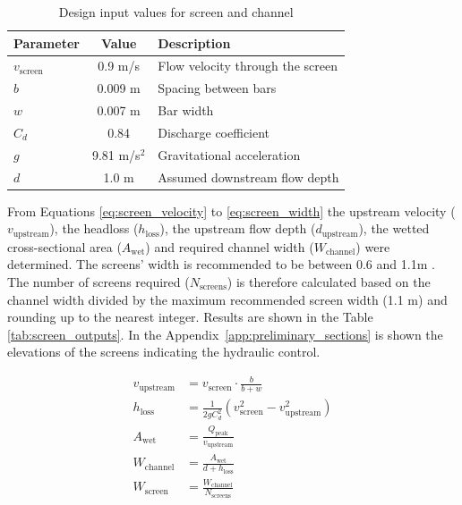 \documentclass[11pt]{article}
\begin{document}
\begin{table}[h]
\centering
\caption{Design input values for screen and channel}
\label{tab:screen_inputs}
\begin{tabular}{|l|c|l|}
\hline
\textbf{Parameter} & \textbf{Value} & \textbf{Description} \\
\hline
$v_{\text{screen}}$ & 0.9 m/s & Flow velocity through the screen \\
$b$ & 0.009 m & Spacing between bars \\
$w$ & 0.007 m & Bar width \\
$C_d$ & 0.84 & Discharge coefficient \\
$g$ & 9.81 m/s$^2$ & Gravitational acceleration \\
$d$ & 1.0 m & Assumed downstream flow depth \\
\hline
\end{tabular}
\end{table}

From Equations \eqref{eq:screen_velocity} to 
\eqref{eq:screen_width}
 the upstream velocity ($v_\text{upstream}$), 
the headloss ($h_\text{loss}$), the upstream flow depth ($d_\text{upstream}$), 
the wetted cross-sectional area ($A_\text{wet}$) and required channel width ($W_\text{channel}$) 
were determined.
The screens' width is recommended to be between 0.6 and 1.1m \cite{metcalf_2014_wastewater}. 
The number of screens required ($N_\text{screens}$) is therefore calculated based on the 
channel width divided by the maximum recommended screen width (1.1 m) and 
rounding up to the nearest integer. Results are shown 
in the Table \ref{tab:screen_outputs}. In the Appendix~\ref{app:preliminary_sections} is shown the 
elevations of the screens indicating the hydraulic control.

\begin{align}
  v_{\text{upstream}} &= v_{\text{screen}} \cdot \frac{b}{b + w} \label{eq:screen_velocity} \\
  h_{\text{loss}} &= \frac{1}{2g C_d^2} \left( v_{\text{screen}}^2 - v_{\text{upstream}}^2 \right) \label{eq:screen_headloss} \\
  A_{\text{wet}} &= \frac{Q_{\text{peak}}}{v_{\text{upstream}}} \label{eq:screen_area} \\
  W_{\text{channel}} &= \frac{A_{\text{wet}}}{d + h_{\text{loss}}} \label{eq:screen_width}\\
  W_{\text{screen}} &=\frac{W_{\text{channel}}}{N_{\text{screens}}}
  \end{align}
\end{document}
